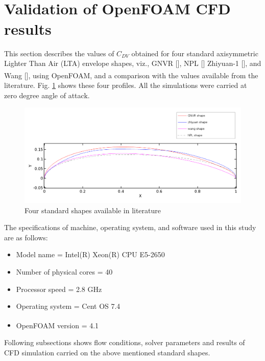 \section{Validation of OpenFOAM\textsuperscript{\textregistered} CFD results}
\label{results}

This section describes the values of $C_{DV}$ obtained for four standard axisymmetric Lighter Than Air (LTA) envelope shapes, viz., GNVR [], NPL [] Zhiyuan-1 [], and Wang [], using OpenFOAM\textsuperscript{\textregistered}, and a comparison with the values available from the literature. Fig. \ref{All profiles} shows these four profiles. All the simulations were carried at zero degree angle of attack.

\begin{figure}[H]
	\centering
	\includegraphics[width=400 pt]{rnd/all_profiles.png}
	\caption{Four standard shapes available in literature}
	\label{All profiles} 
\end{figure}
The specifications of machine, operating system, and software used in this study are as follows:
\begin{itemize}
	\item Model name = Intel(R) Xeon(R) CPU E5-2650
	\item Number of physical cores = 40
	\item Processor speed = 2.8 GHz
	\item Operating system = Cent OS 7.4
	\item OpenFOAM\textsuperscript{\textregistered} version = 4.1
\end{itemize}
Following subsections shows flow conditions, solver parameters and results of CFD simulation carried on the above mentioned standard shapes. 

